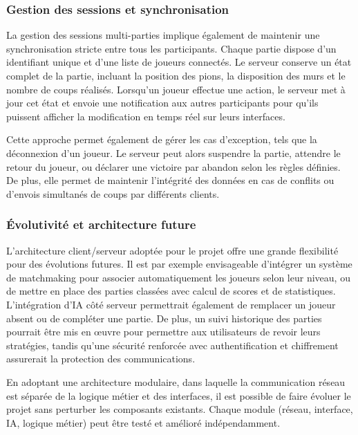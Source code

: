 \documentclass[a4paper]{article}
\begin{document}
\subsubsection{Gestion des sessions et synchronisation}


La gestion des sessions multi-parties implique également de maintenir une synchronisation stricte entre tous les participants. Chaque partie dispose d’un identifiant unique et d’une liste de joueurs connectés. Le serveur conserve un état complet de la partie, incluant la position des pions, la disposition des murs et le nombre de coups réalisés. Lorsqu’un joueur effectue une action, le serveur met à jour cet état et envoie une notification aux autres participants pour qu’ils puissent afficher la modification en temps réel sur leurs interfaces.


Cette approche permet également de gérer les cas d’exception, tels que la déconnexion d’un joueur. Le serveur peut alors suspendre la partie, attendre le retour du joueur, ou déclarer une victoire par abandon selon les règles définies. De plus, elle permet de maintenir l’intégrité des données en cas de conflits ou d’envois simultanés de coups par différents clients.


\subsubsection{Évolutivité et architecture future}



L’architecture client/serveur adoptée pour le projet offre une grande flexibilité pour des évolutions futures. Il est par exemple envisageable d’intégrer un système de matchmaking pour associer automatiquement les joueurs selon leur niveau, ou de mettre en place des parties classées avec calcul de scores et de statistiques. L’intégration d’IA côté serveur permettrait également de remplacer un joueur absent ou de compléter une partie. De plus, un suivi historique des parties pourrait être mis en œuvre pour permettre aux utilisateurs de revoir leurs stratégies, tandis qu'une sécurité renforcée avec authentification et chiffrement assurerait la protection des communications.


En adoptant une architecture modulaire, dans laquelle la communication réseau est séparée de la logique métier et des interfaces, il est possible de faire évoluer le projet sans perturber les composants existants. Chaque module (réseau, interface, IA, logique métier) peut être testé et amélioré indépendamment.
\end{document}
